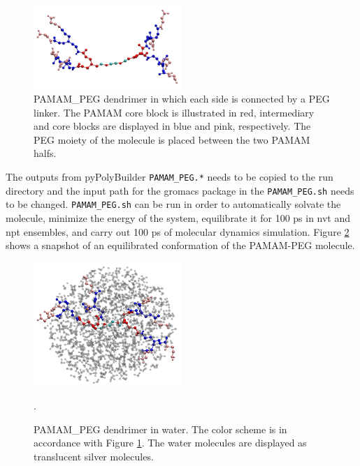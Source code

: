 \begin{figure}
    \centering
    \includegraphics[width=0.5\textwidth]{PAMAM_PEG/PAMAM_PEG_PPB.pdf}
    \caption{PAMAM\_PEG dendrimer in which each side is connected by a PEG linker. The PAMAM core block is illustrated in red, intermediary and core blocks are displayed in blue and pink, respectively. The PEG moiety of the molecule is placed between the two PAMAM halfs.}
    \label{fig:PAMAMPEGPPB}
\end{figure}

The outputs from pyPolyBuilder \texttt{PAMAM\_PEG.*} needs to be copied to the run directory and the input path for the gromacs package in the \texttt{PAMAM\_PEG.sh} needs to be changed.
\texttt{PAMAM\_PEG.sh} can be run in order to automatically solvate the molecule, minimize the energy of the system, equilibrate it for 100 ps in nvt and npt ensembles, and carry out 100 ps of molecular dynamics simulation.
Figure \ref{fig:PAMAMPEGSOL} shows a snapshot of an equilibrated conformation of the PAMAM-PEG molecule.

\begin{figure}
    \centering
    \includegraphics[width=0.5\textwidth]{PAMAM_PEG/PAMAM_PEG_SOL.pdf}
    \caption{PAMAM\_PEG dendrimer in water. The color scheme is in accordance with Figure \ref{fig:PAMAMPEGPPB}. The water molecules are displayed as translucent silver molecules.}.
    \label{fig:PAMAMPEGSOL}
\end{figure}